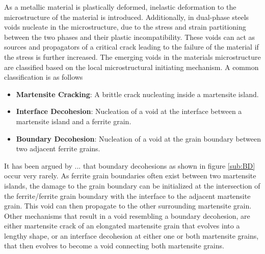 


As a metallic material is plastically deformed, inelastic deformation to the microstructure of the material is introduced. Additionally, in dual-phase steels voids nucleate in the microstructure, due to the stress and strain partitioning between the two phases and their plastic incompatibility. These voids can act as sources and propagators of a critical crack leading to the failure of the material if the stress is further increased. The emerging voids in the materials microstructure are classified based on the local microstructural initiating mechanism. A common classification is as follows
\begin{itemize}[label={}]
\item \textbf{Martensite Cracking}: A brittle crack nucleating inside a martensite island.
\item \textbf{Interface Decohesion}: Nucleation of a void at the interface between a martensite island and a ferrite grain.
\item \textbf{Boundary Decohesion}: Nucleation of a void at the grain boundary between two adjacent ferrite grains.
\end{itemize}
It has been argued by ... that boundary decohesions as shown in figure \ref{sub:BD} occur very rarely. As ferrite grain boundaries often exist between two martensite islands, the damage to the grain boundary can be initialized at the intersection of the ferrite/ferrite grain boundary with the interface to the adjacent martensite grain. This void can then propagate to the other surrounding martensite grain. Other mechanisms that result in a void resembling a boundary decohesion, are either martensite crack of an elongated martensite grain that evolves into a lengthy shape, or an interface decohesion at either one or both martensite grains, that then evolves to become a void connecting both martensite grains.\\

